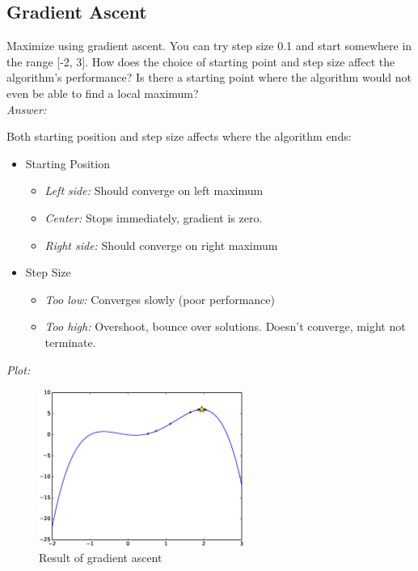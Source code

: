 \documentclass{article}           %
\newcommand\marginsymbol[1][0pt]{%
  \tabto*{0cm}\makebox[\dimexpr-1cm-#1\relax][r]{$\mathbb{P}$}\tabto*{\TabPrevPos}}
\begin{document}
\subsection{Gradient Ascent \marginsymbol}
\label{subsec:grada}
Maximize using gradient ascent.
You can try step size 0.1 and start somewhere in the range [-2, 3].
How does the choice of starting point and step size affect the algorithm's performance?
Is there a starting point where the algorithm would not even be able to find a local maximum?\\

\emph{Answer:}

Both starting position and step size affects where the algorithm ends:
\begin{itemize}
    \item Starting Position
    \begin{itemize}
        \item \emph{Left side:} Should converge on left maximum
        \item \emph{Center:} Stops immediately, gradient is zero.
        \item \emph{Right side:} Should converge on right maximum
    \end{itemize}
    \item Step Size
    \begin{itemize}
        \item \emph{Too low:} Converges slowly (poor performance)
        \item \emph{Too high:} Overshoot, bounce over solutions. Doesn't converge, might not terminate.
    \end{itemize}
\end{itemize}

\emph{Plot:}
\begin{figure}[H]
\begin{center}
\includegraphics[width=0.6\textwidth]{eps/w1e1c.eps}
\caption{Result of gradient ascent}
\label{fig:w1e1c}
\end{center}
\end{figure}
\end{document}
